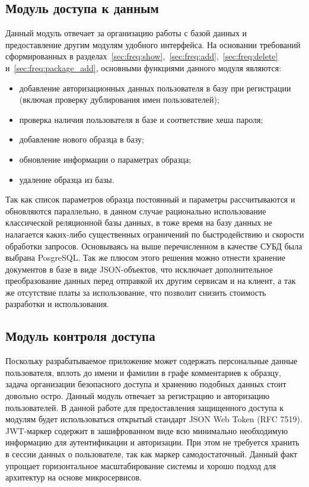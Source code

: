 \subsection{Модуль доступа к данным}
Данный модуль отвечает за организацию работы с базой данных и предоставление другим модулям удобного интерфейса.
На основании требований сформированных в разделах~\ref{sec:freq:show},~\ref{sec:freq:add},~\ref{sec:freq:delete} и~\ref{sec:freq:package_add}, основными функциями данного модуля являются:
\begin{itemize}
  \item добавление авторизационных данных пользователя в базу при регистрации (включая проверку дублирования имен пользователей);
  \item проверка наличия пользователя в базе и соответствие хеша пароля;
  \item добавление нового образца в базу;
  \item обновление информации о параметрах образца;
  \item удаление образца из базы.
\end{itemize}

Так как список параметров образца постоянный и параметры рассчитываются и обновляются параллельно, в данном случае рационально использование классической реляционной базы данных, в тоже время на базу данных не налагается каких-либо существенных ограничений по быстродействию и скорости обработки запросов. Основываясь на выше перечисленном в качестве СУБД была выбрана PosgreSQL.
Так же плюсом этого решения можно отнести хранение документов в базе в виде JSON-объектов, что исключает дополнительное преобразование данных перед отправкой их другим сервисам и на клиент, а так же отсутствие платы за использование, что позволит снизить стоимость разработки и использования.

\subsection{Модуль контроля доступа}
Поскольку разрабатываемое приложение может содержать персональные данные пользователя, вплоть до имени и фамилии в графе комментариев к образцу, задача организации безопасного доступа и хранению подобных данных стоит довольно остро.
Данный модуль отвечает за регистрацию и авторизацию пользователей. 
В данной работе для предоставления защищенного доступа к модулям будет использоваться открытый стандарт JSON Web Token (RFC 7519). JWT-маркер  содержит в зашифрованном виде всю минимально необходимую информацию для аутентификации и авторизации. При этом не требуется хранить в сессии данных о пользователе, так как маркер самодостаточный. Данный факт упрощает горизонтальное масштабирование системы и хорошо подход для архитектур на основе микросервисов.

